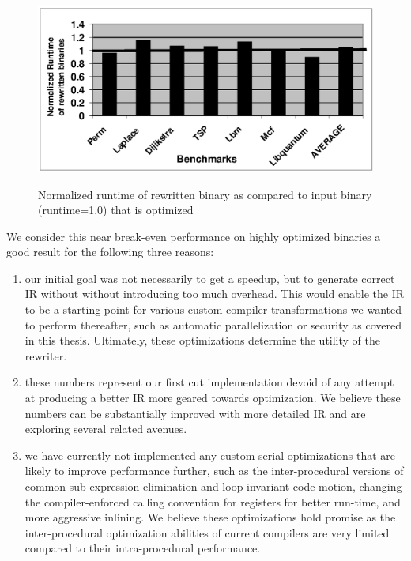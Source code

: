 \begin{figure}
\begin{centering}
\includegraphics{perfopt4}
\par\end{centering}
\renewcommand{\baselinestretch}{1}
\small\normalsize
\begin{quote}
\caption{Normalized runtime of rewritten binary as compared to input binary (runtime=1.0) that is
optimized}
\label{withopts}
\end{quote}
\end{figure}
\renewcommand{\baselinestretch}{2}
\small\normalsize

We consider this near break-even performance on highly optimized binaries a good result for the
following three reasons: 

\begin{enumerate}

\item our initial goal was not necessarily to get a speedup, but to
generate correct IR without without introducing too much overhead. This would enable the IR to be a
starting point for various custom compiler transformations we wanted to perform thereafter, such as
automatic parallelization or security as covered in this thesis. Ultimately, these optimizations
determine the utility of the rewriter. 

\item these numbers represent our first cut implementation devoid of any attempt at producing a
better IR more geared towards optimization. We believe these numbers can be substantially improved
with more detailed IR and are exploring several related avenues. 

\item we have currently not implemented any custom serial optimizations that are likely to improve
performance further, such as the inter-procedural versions of common sub-expression elimination and
loop-invariant code motion, changing the compiler-enforced calling convention for registers for
better run-time, and more aggressive inlining. We believe these optimizations hold promise as the
inter-procedural optimization abilities of current compilers are very limited compared to their
intra-procedural performance.

\end{enumerate}


